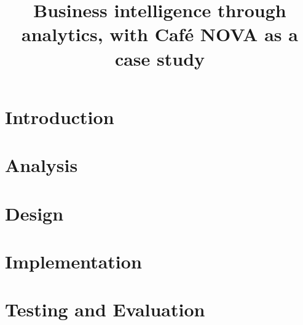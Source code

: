 \documentclass[11pt]{report}
\title{Business intelligence through analytics, with Café NOVA as a case study}
\subtitle{}
\begin{document}
    

    \maketitle

    \tableofcontents



    \chapter{Introduction}\label{ch:introduction}

    

    \chapter{Analysis}\label{ch:analysis}

    
    
    

    \chapter{Design}\label{ch:design}

    
    
    

    \chapter{Implementation}\label{ch:implementation}

    
    
    
    
    

    \chapter{Testing and Evaluation}\label{ch:testing-and-evaluation}
\end{document}
